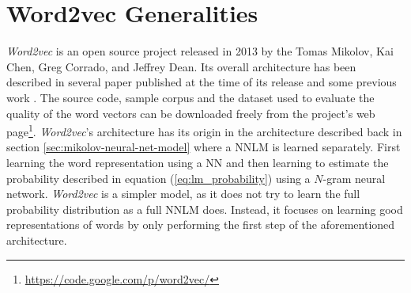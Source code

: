 






\section{Word2vec Generalities}
\label{sec:word2v-generalities}

\textit{Word2vec} is an open source project released in 2013 by the Tomas
Mikolov,  Kai Chen, Greg Corrado, and Jeffrey Dean. \cite{DBLP:journals/corr/abs-1301-3781} 
Its overall architecture has been described in several paper published at the
time of its release
\cite{DBLP:journals/corr/abs-1301-3781,MikolovSCCD13,conf/naacl/MikolovYZ13} 
and some previous work \cite{mikolovphd2012}. The source code, sample corpus
and the dataset used to evaluate the quality of the word vectors  can be downloaded freely from the project's
 web page\footnote{\url{https://code.google.com/p/word2vec/}}.
\textit{Word2vec}'s architecture
has its origin  in the architecture described back in section 
\ref{sec:mikolov-neural-net-model} where a \ac{NNLM} is learned separately. 
First learning the word representation using a \ac{NN} and then learning to estimate the probability described in equation (\ref{eq:lm_probability}) using a $N$-gram neural
network.  \textit{Word2vec}  is a simpler model, as it  does not
try to learn the full probability distribution as a full \ac{NNLM} does.
Instead, it  focuses on learning good representations of words by  only
performing  the first step  of the aforementioned architecture. %

